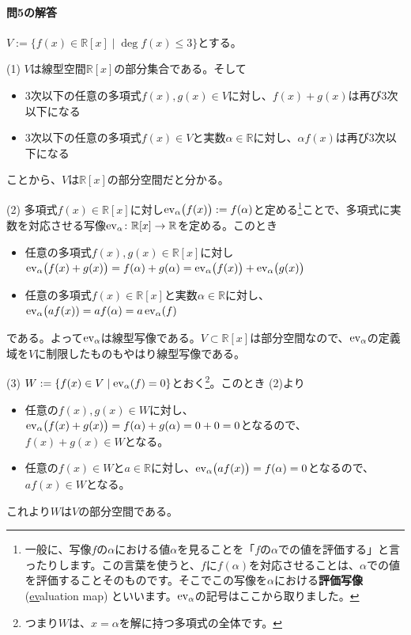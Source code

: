 \paragraph{問5の解答}
$V:= \{f(x)\in\mathbb{R}[x] \mid \deg f(x) \leq 3\}$とする。

\noindent (1) $V$は線型空間$\mathbb{R}[x]$の部分集合である。そして
\begin{itemize}
\item $3$次以下の任意の多項式$f(x), g(x)\in V$に対し、$f(x) + g(x)$は再び$3$次以下になる
\item $3$次以下の任意の多項式$f(x) \in V$と実数$\alpha \in\mathbb{R}$に対し、$\alpha f(x)$は再び$3$次以下になる
\end{itemize}
ことから、$V$は$\mathbb{R}[x]$の部分空間だと分かる。

\noindent (2) 多項式$f(x)\in\mathbb{R}[x]$に対し$\operatorname{ev}_{\alpha}\bigl(f(x)\bigr) := f(\alpha)$と定める\footnote{一般に、写像$f$の$\alpha$における値$\alpha$を見ることを「$f$の$\alpha$での値を評価する」と言ったりします。この言葉を使うと、$f$に$f(\alpha)$を対応させることは、$\alpha$での値を評価することそのものです。そこでこの写像を$\alpha$における\textbf{評価写像} (\underline{ev}aluation map) といいます。$\operatorname{ev}_{\alpha}$の記号はここから取りました。}ことで、多項式に実数を対応させる写像$\operatorname{ev}_{\alpha}\colon\mathbb{R}[x]\rightarrow\mathbb{R}$を定める。このとき
\begin{itemize}
\item 任意の多項式$f(x), g(x) \in\mathbb{R}[x]$に対し$\operatorname{ev}_{\alpha}\bigl(f(x)+g(x)\bigr) = f(\alpha) + g(\alpha) = \operatorname{ev}_{\alpha}\bigl(f(x)\bigr) + \operatorname{ev}_{\alpha}\bigl(g(x)\bigr)$
\item 任意の多項式$f(x)\in\mathbb{R}[x]$と実数$\alpha\in\mathbb{R}$に対し、$\operatorname{ev}_{\alpha}\bigl(af(x)) = a f(\alpha) = a \operatorname{ev}_{\alpha}(f)$
\end{itemize}
である。よって$\operatorname{ev}_{\alpha}$は線型写像である。$V\subset\mathbb{R}[x]$は部分空間なので、$\operatorname{ev}_{\alpha}$の定義域を$V$に制限したものもやはり線型写像である。

\noindent (3) $W := \{f(x) \in V \mid \operatorname{ev}_{\alpha}(f) = 0\}$とおく\footnote{つまり$W$は、$x = \alpha$を解に持つ多項式の全体です。}。このとき (2)より
\begin{itemize}
\item 任意の$f(x), g(x)\in W$に対し、$\operatorname{ev}_{\alpha}\bigl(f(x) + g(x)\bigr) = f(\alpha) + g(\alpha) = 0 + 0 = 0$となるので、$f(x) + g(x) \in W$となる。
\item 任意の$f(x) \in W$と$a\in\mathbb{R}$に対し、$\operatorname{ev}_{\alpha}\bigl(a f(x)\bigr) = f(\alpha) = 0$となるので、$af(x)\in W$となる。
\end{itemize}
これより$W$は$V$の部分空間である。

